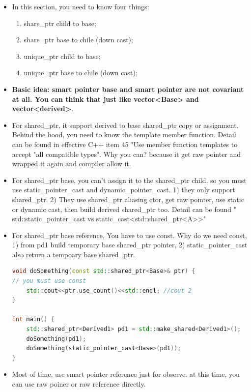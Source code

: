 \documentclass[a4paper,12pt,twoside]{book}
\begin{document}
\begin{itemize}
\item In this section, you need to know four things:
\begin{enumerate}
\item share\_ptr child to base;
\item share\_ptr base to chile (down cast);
\item unique\_ptr child to base;
\item unique\_ptr base to chile (down cast);
\end{enumerate}

		\item \textbf{Basic idea: smart pointer base and smart pointer are not covariant at all. You can think that just like vector<Base> and vector<derived>}.

		\item For shared\_ptr, it support derived to base shared\_ptr copy or assignment. Behind the hood, you need to know the template member function. Detail can be found in effective C++ item 45 "Use member function templates to accept "all compatible types". Why you can? because it get raw pointer and wrapped it again and compiler allow it.

		\item  For shared\_ptr base, you can't assign it to the shared\_ptr child, so you must use static\_pointer\_cast and dynamic\_pointer\_cast. 1) they only support shared\_ptr. 2) They use shared\_ptr aliasing ctor, get raw pointer, use static or dynamic cast, then build derived shared\_ptr too. Detail can be found "
std::static\_pointer\_cast vs static\_cast<std::shared\_ptr<A>>"

\item For shared\_ptr base reference, You have to use const. Why do we need const, 1) from pd1 build temporary base shared\_ptr pointer, 2) static\_pointer\_cast also return a tempoary base shared\_ptr.
\begin{lstlisting}[frame=single, language=c++, mathescape=true]
void doSomething(const std::shared_ptr<Base>& ptr) {
// you must use const
    std::cout<<ptr.use_count()<<std::endl; //cout 2
}

int main() {
    std::shared_ptr<Derived1> pd1 = std::make_shared<Derived1>();
    doSomething(pd1);
	doSomething(static_pointer_cast<Base>(pd1));
} 
\end{lstlisting}


\item Most of time, use smart pointer reference just for observe. at this time, you can use raw poiner or raw reference directly. 


\end{itemize}
\end{document}
